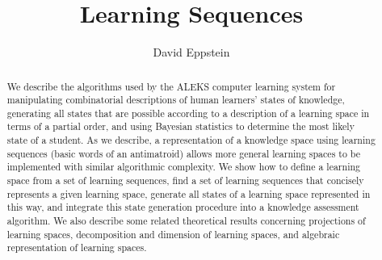 \documentclass[11pt]{llncs}
\begin{document}
\title{Learning Sequences}
\author{David Eppstein}


\maketitle

\begin{abstract}
We describe the algorithms used by the ALEKS computer learning system for manipulating combinatorial descriptions of human learners' states of knowledge, generating all states that are possible according to a description of a learning space in terms of a partial order, and using Bayesian statistics to determine the most likely state of a student. As we describe, a representation of a knowledge space using learning sequences (basic words of an antimatroid) allows more general learning spaces to be implemented with similar algorithmic complexity. We show how to define a learning space from a set of learning sequences, find a set of learning sequences that concisely represents a given learning space, generate all states of a learning space represented in this way, and integrate this state generation procedure into a knowledge assessment algorithm. We also describe some related theoretical results concerning projections of learning spaces, decomposition and dimension of learning spaces, and algebraic representation of learning spaces.
\end{abstract}

\else
\end{document}
